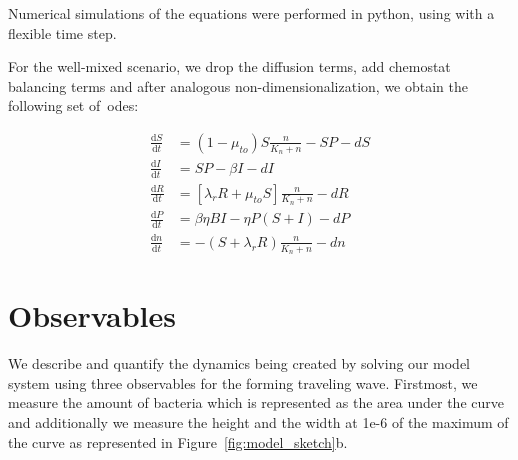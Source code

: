 Numerical simulations of the equations were performed in python, using  with a flexible time step.

For the well-mixed scenario, we drop the diffusion terms, add chemostat balancing terms and after analogous non-dimensionalization, we obtain the following set of~\gls{ode}s:

\begin{align}
    \frac{\text{d}S}{\text{d}t} &= \left( 1 - \mu_{to} \right) S \frac{n}{K_n+n}  - SP - d S\\
    \frac{\text{d}I}{\text{d}t} &= SP - \beta I - d I\\
    \frac{\text{d}R}{\text{d}t} &= \left[\lambda_r R + \mu_{to} S \right] \frac{n}{K_n+n} - d R\\
    \frac{\text{d}P}{\text{d}t} &= \beta \eta BI - \eta P(S+I) -d P\\
    \frac{\text{d}n}{\text{d}t} &= - \left( S + \lambda_r R \right) \frac{n}{K_n+n} - d n
\end{align}

\section{Observables}

We describe and quantify the dynamics being created by solving our model system using three observables for the forming traveling wave. Firstmost, we measure the amount of bacteria which is represented as the area under the curve and additionally we measure the height and the width at 1e-6 of the maximum of the curve as represented in Figure~\ref{fig:model_sketch}b.
